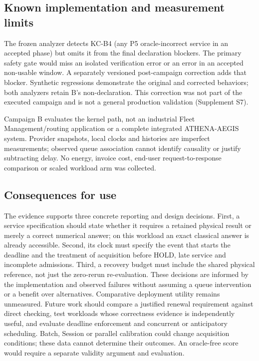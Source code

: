 \documentclass[pdflatex,sn-mathphys-num]{sn-jnl}
\begin{document}
\subsection{Known implementation and measurement limits}
The frozen analyzer detects KC-B4 (any P5 oracle-incorrect service in an accepted phase) but omits it from the final declaration blockers. The primary safety gate would miss an isolated verification error or an error in an accepted non-usable window. A separately versioned post-campaign correction adds that blocker. Synthetic regressions demonstrate the original and corrected behaviors; both analyzers retain B's non-declaration. This correction was not part of the executed campaign and is not a general production validation (Supplement S7).

Campaign B evaluates the kernel path, not an industrial Fleet Management/routing application or a complete integrated ATHENA-AEGIS system. Provider snapshots, local clocks and histories are imperfect measurements; observed queue association cannot identify causality or justify subtracting delay. No energy, invoice cost, end-user request-to-response comparison or scaled workload arm was collected.

\subsection{Consequences for use}
The evidence supports three concrete reporting and design decisions. First, a service specification should state whether it requires a retained physical result or merely a correct numerical answer; on this workload an exact classical answer is already accessible. Second, its clock must specify the event that starts the deadline and the treatment of acquisition before HOLD, late service and incomplete admissions. Third, a recovery budget must include the shared physical reference, not just the zero-rerun re-evaluation. These decisions are informed by the implementation and observed failures without assuming a queue intervention or a benefit over alternatives. Comparative deployment utility remains unmeasured. Future work should compare a justified renewal requirement against direct checking, test workloads whose correctness evidence is independently useful, and evaluate deadline enforcement and concurrent or anticipatory scheduling. Batch, Session or parallel calibration could change acquisition conditions; these data cannot determine their outcomes. An oracle-free score would require a separate validity argument and evaluation.
\end{document}
